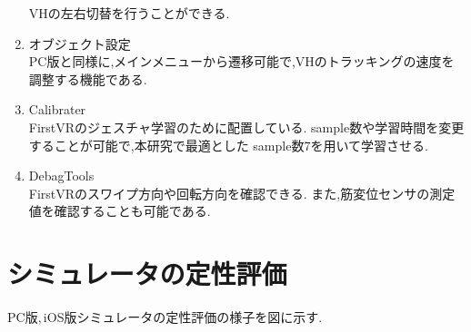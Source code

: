 \documentclass{ltjsreport}
\begin{document}
\begin{enumerate}
				VHの左右切替を行うことができる.
			\item オブジェクト設定\\
				PC版と同様に,メインメニューから遷移可能で,VHのトラッキングの速度を調整する機能である.
			\item Calibrater\\
				FirstVRのジェスチャ学習のために配置している.
				sample数や学習時間を変更することが可能で,本研究で最適とした
				sample数7を用いて学習させる.
			\item DebagTools\\
				FirstVRのスワイプ方向や回転方向を確認できる.
				また,筋変位センサの測定値を確認することも可能である.
		\end{enumerate}

	\section{シミュレータの定性評価}
		PC版,\,iOS版シミュレータの定性評価の様子を図に示す.
\end{document}
